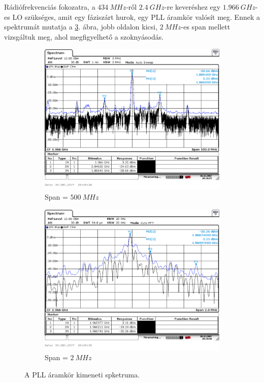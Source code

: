 Rádiófrekvenciás fokozatra, a $\SI{434}{MHz}$-ről $\SI{2.4}{GHz}$-re keveréshez egy $\SI{1.966}{GHz}$-es LO szükséges, amit egy fáziszárt hurok, egy PLL áramkör valósít meg. Ennek a spektrumát mutatja a \ref{fig:PLL}. ábra, jobb oldalon kicsi, $\SI{2}{MHz}$-es span mellett vizsgáltuk meg, ahol megfigyelhető a szoknyásodás.

\begin{figure}[H]
	\centering
	\begin{subfigure}[b]{0.49\textwidth}
		\includegraphics[width=\textwidth,keepaspectratio]{kepek/A_csop_012.PNG}
		\caption{Span = $\SI{500}{MHz}$}
		\label{fig:PLL_span500}
	\end{subfigure}
	\begin{subfigure}[b]{0.49\textwidth}
		\includegraphics[width=\textwidth,keepaspectratio]{kepek/A_csop_013.PNG}
		\caption{Span = $\SI{2}{MHz}$}
		\label{fig:PLL_span2}
	\end{subfigure}
	\caption{A PLL áramkör kimeneti spketruma.}
	\label{fig:PLL}
\end{figure}

